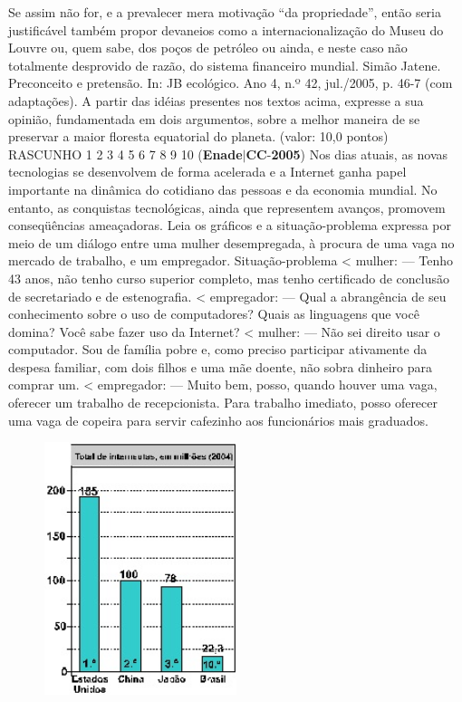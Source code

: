 \documentclass{exam}
\begin{document}
\begin{questions}
Se assim não for, e a prevalecer mera motivação “da propriedade”, então seria justificável também propor devaneios
como a internacionalização do Museu do Louvre ou, quem sabe, dos poços de petróleo ou ainda, e neste caso não totalmente
desprovido de razão, do sistema financeiro mundial.
Simão Jatene. Preconceito e pretensão. In: JB ecológico. Ano 4, n.º 42, jul./2005, p. 46-7 (com adaptações).
A partir das idéias presentes nos textos acima, expresse a sua opinião, fundamentada em dois argumentos, sobre
a melhor maneira de se preservar a maior floresta equatorial do planeta.
(valor: 10,0 pontos)
RASCUNHO
1
2
3
4
5
6
7
8
9
10
\question (\textbf{Enade}$|$\textbf{CC}-\textbf{2005}) Nos dias atuais, as novas tecnologias se desenvolvem de forma acelerada e a Internet ganha papel importante
na dinâmica do cotidiano das pessoas e da economia mundial. No entanto, as conquistas tecnológicas, ainda que
representem avanços, promovem conseqüências ameaçadoras.
Leia os gráficos e a situação-problema expressa por meio de um diálogo entre uma mulher desempregada, à procura de uma vaga no
mercado de trabalho, e um empregador.
Situação-problema
< mulher:
— Tenho 43 anos, não tenho curso superior
completo, mas tenho certificado de conclusão de
secretariado e de estenografia.
< empregador:
— Qual a abrangência de seu conhecimento sobre o
uso de computadores? Quais as linguagens que
você domina? Você sabe fazer uso da Internet?
< mulher:
— Não sei direito usar o computador. Sou de
família pobre e, como preciso participar
ativamente da despesa familiar, com dois filhos
e uma mãe doente, não sobra dinheiro para
comprar um.
< empregador:
— Muito bem, posso, quando houver uma vaga,
oferecer um trabalho de recepcionista. Para
trabalho imediato, posso oferecer uma vaga de
copeira para servir cafezinho aos funcionários
mais graduados.
\begin{figure}[H]
	\begin{center}
		\includegraphics[width=0.5\textwidth]{CIENCIA_DA_COMPUTACAO_Prova2005-utf8_figuras/fig-0007.jpg}

\end{center}
\end{figure}
\end{questions}
\end{document}
